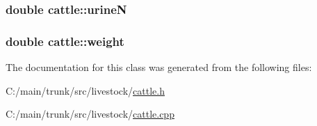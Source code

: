 \label{classcattle_ad2e1f9f817dc243c4ca19136e0871b77}
\hypertarget{classcattle_a6743facaa4de4b92350ef52cc2e6b8ed}{
\subsubsection[{urineN}]{\setlength{\rightskip}{0pt plus 5cm}double {\bf cattle::urineN}}}
\label{classcattle_a6743facaa4de4b92350ef52cc2e6b8ed}
\hypertarget{classcattle_a16519b87deea03a710cd5ce401fdb7ba}{
\subsubsection[{weight}]{\setlength{\rightskip}{0pt plus 5cm}double {\bf cattle::weight}}}
\label{classcattle_a16519b87deea03a710cd5ce401fdb7ba}


The documentation for this class was generated from the following files:\begin{DoxyCompactItemize}
\item 
C:/main/trunk/src/livestock/\hyperlink{cattle_8h}{cattle.h}\item 
C:/main/trunk/src/livestock/\hyperlink{cattle_8cpp}{cattle.cpp}\end{DoxyCompactItemize}
